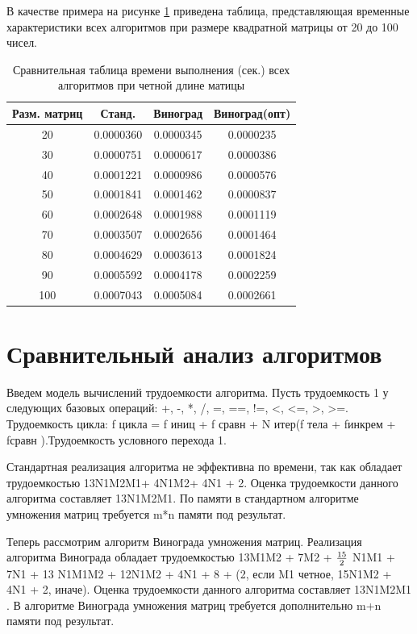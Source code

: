 \documentclass[12pt]{report}
\begin{document}
\par

В качестве примера на рисунке \ref{table:ref16} приведена таблица, представляющая временные характеристики всех алгоритмов при размере квадратной матрицы от 20 до 100 чисел.
\begin{table}[ht]
	\centering
	\caption{Сравнительная таблица времени выполнения (сек.) всех алгоритмов при четной длине матицы}
	\begin{tabular}{|c c c c|}
		\hline
		Разм. матриц & Станд. & Виноград & Виноград(опт)  \\ [0.5ex] 
 		\hline\hline
		20 & 0.0000360 & 0.0000345 & 0.0000235\\
 		\hline
 		30 & 0.0000751 & 0.0000617 & 0.0000386\\
 		\hline
 		40 & 0.0001221 & 0.0000986 & 0.0000576\\
 		\hline
		50 & 0.0001841 & 0.0001462 & 0.0000837\\
		\hline
		60 & 0.0002648 & 0.0001988 & 0.0001119\\
		\hline
		70 & 0.0003507 & 0.0002656 & 0.0001464\\
		\hline
		80 & 0.0004629 & 0.0003613 & 0.0001824\\
		\hline
		90 & 0.0005592 & 0.0004178 & 0.0002259\\
		\hline
		100 & 0.0007043 & 0.0005084 & 0.0002661\\
		\hline
	\end{tabular}
	\label{table:ref16}
\end{table} 

\section{Сравнительный анализ алгоритмов}

Введем модель вычислений трудоемкости алгоритма.
Пусть трудоемкость 1 у следующих базовых операций: +, -, *, /, =, ==, !=, <, <=, >, >=. Трудоемкость цикла: f цикла = f иниц + f сравн + N итер(f тела +
fинкрем + fсравн ).Трудоемкость условного перехода 1.

Стандартная реализация алгоритма не эффективна по времени, так как
обладает трудоемкостью 13N1M2M1+ 4N1M2+ 4N1 + 2.
Оценка трудоемкости данного алгоритма составляет 13N1M2M1. 
По памяти в стандартном алгоритме умножения матриц требуется m*n памяти под результат.

Теперь рассмотрим алгоритм Винограда умножения матриц. 
Реализация алгоритма Винограда обла­дает трудоемкостью 13M1M2 + 7M2 + ${15\over{2}}$ N1M1 + 7N1 + 13 N1M1M2 + 12N1M2 + 4N1 + 8 + (2, если M1 четное, 15N1M2 + 4N1 + 2, иначе).
Оценка трудоемкости данного алгоритма составляет 13N1M2M1 .
В алгоритме Винограда умножения матриц требуется дополнительно m+n памяти под результат.
\end{document}
